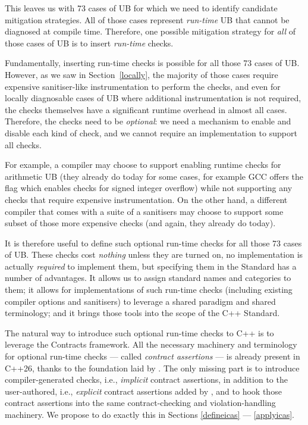 This leaves us with 73 cases of UB for which we need to identify candidate mitigation strategies. All of those cases represent \emph{run-time} UB that cannot be diagnosed at compile time. Therefore, one possible mitigation strategy for \emph{all} of those cases of UB is to insert \emph{run-time} checks.

Fundamentally, inserting run-time checks is possible for all those 73 cases of UB. However, as we saw in Section~\ref{locally}, the majority of those cases require expensive sanitiser-like instrumentation to perform the checks, and even for locally diagnosable cases of UB where additional instrumentation is not required, the checks themselves have a significant runtime overhead in almost all cases. Therefore, the checks need to be \emph{optional}: we need a mechanism to enable and disable each kind of check, and we cannot require an implementation to support all checks.

For example, a compiler may choose to support enabling runtime checks for arithmetic UB (they already do today for some cases, for example GCC offers the  flag which enables checks for signed integer overflow) while not supporting any checks that require expensive instrumentation. On the other hand, a different compiler that comes with a suite of a sanitisers may choose to support some subset of those more expensive checks (and again, they already do today).

It is therefore useful to define such optional run-time checks for all those 73 cases of UB. These checks cost \emph{nothing} unless they are turned on, no implementation is actually \emph{required} to implement them, but specifying them in the Standard has a number of advantages. It allows us to assign standard names and categories to them; it allows for implementations of such run-time checks (including existing compiler options and sanitisers) to leverage a shared paradigm and shared terminology; and it brings those tools into the scope of the C++ Standard. %

The natural way to introduce such optional run-time checks to C++ is to leverage the Contracts framework. All the necessary machinery and terminology for optional run-time checks --- called \emph{contract assertions} --- is already present in C++26, thanks to the foundation laid by \cite{P2900R14}. The only missing part is to introduce compiler-generated checks, i.e., \emph{implicit} contract assertions, in addition to the user-authored, i.e., \emph{explicit} contract assertions added by \cite{P2900R14}, and to hook those contract assertions into the same contract-checking and violation-handling machinery. We propose to do exactly this in Sections \ref{defineicas} --- \ref{applyicas}.

